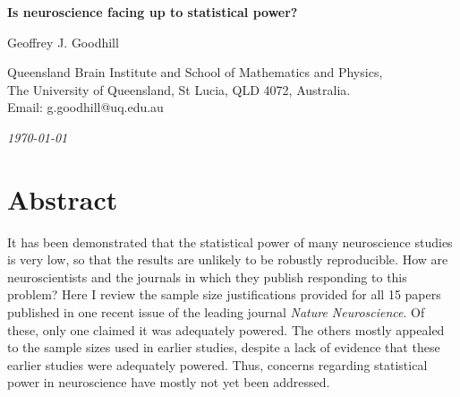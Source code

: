\documentclass[a4paper,11pt]{article}
\begin{document}
\begin{center}

  {\LARGE \bf %
Is neuroscience facing up to statistical power?}

\vspace{3mm}

{\large Geoffrey J. Goodhill}

\vspace{1mm}

Queensland Brain Institute and School of Mathematics and Physics, \\The
University of Queensland, St Lucia, QLD 4072, Australia.\\
Email: g.goodhill@uq.edu.au

\vspace{1mm}

{\em \today}

\end{center}




\section*{Abstract}

It has been demonstrated that the statistical power of many
neuroscience studies is very low, so that the results are unlikely to
be robustly reproducible. How are neuroscientists and the journals in
which they publish responding to this problem? Here I review the
sample size justifications provided for all 15 papers published in one
recent issue of the leading journal {\em Nature Neuroscience}. Of
these, only one claimed it was adequately powered. The others mostly
appealed to the sample sizes used in earlier studies, despite a lack of
evidence that these earlier studies were adequately powered.  Thus,
concerns regarding statistical power in neuroscience have mostly not
yet been addressed.
\end{document}
